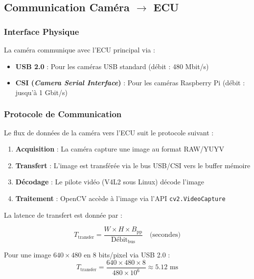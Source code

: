 \subsection{Communication Caméra $\rightarrow$ ECU}

\subsubsection{Interface Physique}

La caméra communique avec l'ECU principal via :
\begin{itemize}
    \item \textbf{USB 2.0} : Pour les caméras USB standard (débit : 480 Mbit/s)
    \item \textbf{CSI (\textit{Camera Serial Interface})} : Pour les caméras Raspberry Pi (débit : jusqu'à 1 Gbit/s)
\end{itemize}

\subsubsection{Protocole de Communication}

Le flux de données de la caméra vers l'ECU suit le protocole suivant :

\begin{enumerate}[leftmargin=2cm]
    \item \textbf{Acquisition} : La caméra capture une image au format RAW/YUYV
    \item \textbf{Transfert} : L'image est transférée via le bus USB/CSI vers le buffer mémoire
    \item \textbf{Décodage} : Le pilote vidéo (V4L2 sous Linux) décode l'image
    \item \textbf{Traitement} : OpenCV accède à l'image via l'API \texttt{cv2.VideoCapture}
\end{enumerate}

La latence de transfert est donnée par :

\begin{equation}
T_{\text{transfer}} = \frac{W \times H \times B_{\text{pp}}}{\text{Débit}_{\text{bus}}} \quad \text{(secondes)}
\label{eq:transfer_latency}
\end{equation}

Pour une image $640 \times 480$ en 8 bits/pixel via USB 2.0 :
\begin{equation}
T_{\text{transfer}} = \frac{640 \times 480 \times 8}{480 \times 10^6} \approx 5.12 \text{ ms}
\end{equation}

